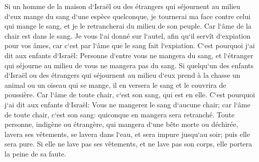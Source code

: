 \verse Si un homme de la maison d`Israël ou des étrangers qui séjournent au milieu d`eux mange du sang d`une espèce quelconque, je tournerai ma face contre celui qui mange le sang, et je le retrancherai du milieu de son peuple. 
\verse Car l`âme de la chair est dans le sang. Je vous l`ai donné sur l`autel, afin qu`il servît d`expiation pour vos âmes, car c`est par l`âme que le sang fait l`expiation. 
\verse C`est pourquoi j`ai dit aux enfants d`Israël: Personne d`entre vous ne mangera du sang, et l`étranger qui séjourne au milieu de vous ne mangera pas du sang. 
\verse Si quelqu`un des enfants d`Israël ou des étrangers qui séjournent au milieu d`eux prend à la chasse un animal ou un oiseau qui se mange, il en versera le sang et le couvrira de poussière. 
\verse Car l`âme de toute chair, c`est son sang, qui est en elle. C`est pourquoi j`ai dit aux enfants d`Israël: Vous ne mangerez le sang d`aucune chair; car l`âme de toute chair, c`est son sang: quiconque en mangera sera retranché. 
\verse Toute personne, indigène ou étrangère, qui mangera d`une bête morte ou déchirée, lavera ses vêtements, se lavera dans l`eau, et sera impure jusqu`au soir; puis elle sera pure. 
\verse Si elle ne lave pas ses vêtements, et ne lave pas son corps, elle portera la peine de sa faute. 

\chapter{}

